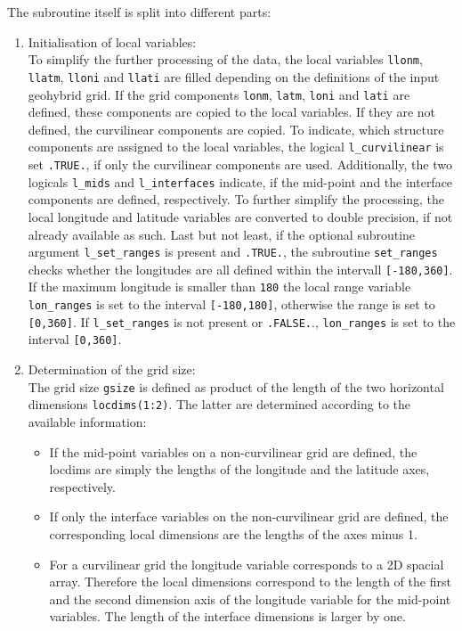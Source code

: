 \documentclass[11pt,twoside]{article}
\begin{document}
The subroutine itself is split into different parts:
\begin{enumerate}
\item Initialisation of local variables: \\
To simplify the further processing of the data, the local variables
 \verb|llonm|, \verb|llatm|, \verb|lloni| and \verb|llati| are filled
depending on the definitions of the input geohybrid grid. If the grid
 components \verb|lonm|, \verb|latm|, \verb|loni| and \verb|lati| are 
defined, these components are copied to the local variables. If they
 are not defined, the curvilinear components are copied.
To indicate, which structure components are assigned to the local
 variables, the logical \verb|l_curvilinear| is set \verb|.TRUE.|, if
 only the curvilinear components are used. Additionally, the
 two logicals \verb|l_mids| and \verb|l_interfaces| indicate, if the
 mid-point and the interface components are defined, respectively. To
 further simplify the processing, the local longitude and latitude
 variables are converted to double precision, if not already
 available as such.
Last but not least, if the optional subroutine argument \verb|l_set_ranges| 
 is present and \verb|.TRUE.|, the subroutine \verb|set_ranges| checks
 whether the longitudes are all defined within the
 intervall \verb|[-180,360]|. If the maximum longitude is smaller
 than \verb|180| the local range variable \verb|lon_ranges| is
 set to the interval \verb|[-180,180]|, otherwise the range is set to 
 \verb|[0,360]|.
If \verb|l_set_ranges| is not present  or \verb|.FALSE.|.,
 \verb|lon_ranges| is set to the interval \verb|[0,360]|.
\item Determination of the grid size: \\
The grid size \verb|gsize| is defined as product of the length of the
two horizontal dimensions \verb|locdims(1:2)|. The latter are
determined according to the available information:
\begin{itemize}
\item If the mid-point variables on a non-curvilinear grid are defined,
the locdims are simply the lengths of the longitude and the latitude
axes, respectively. 
\item If only the interface variables on the non-curvilinear grid are 
defined, the corresponding local dimensions are the lengths of the
 axes minus 1. 
\item For a curvilinear grid the longitude variable
 corresponds to a 2D spacial array. Therefore the local
dimensions  correspond to the length of the first and the second dimension
axis of the longitude variable for the mid-point variables. The length
of the interface dimensions is larger by one.
\end{itemize}


\end{enumerate}
\end{document}
